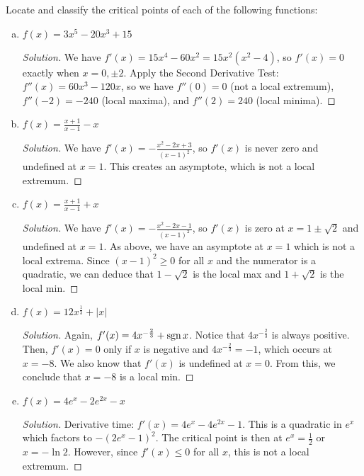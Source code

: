 \documentclass{agony}
\begin{document}
\question Locate and classify the critical points of each of the following functions:
\begin{enumerate}[(a)]
  \item $f(x) = 3x^5-20x^3+15$
        \begin{proof}[Solution]
          We have $f'(x) = 15x^4-60x^2 = 15x^2(x^2-4)$, so $f'(x)=0$ exactly when $x=0,\pm2$.
          Apply the Second Derivative Test: $f''(x) = 60x^3-120x$, so we have
          $f''(0) = 0$ (not a local extremum), $f''(-2) = -240$ (local maxima), and $f''(2)=240$ (local minima).
        \end{proof}
  \item $f(x) = \frac{x+1}{x-1}-x$
        \begin{proof}[Solution]
          We have $f'(x) = -\frac{x^2-2x+3}{(x-1)^2}$, so $f'(x)$ is never zero and undefined at $x=1$.
          This creates an asymptote, which is not a local extremum.
        \end{proof}
  \item $f(x) = \frac{x+1}{x-1}+x$
        \begin{proof}[Solution]
          We have $f'(x) = -\frac{x^2-2x-1}{(x-1)^2}$, so $f'(x)$ is zero at $x=1\pm\sqrt2$ and undefined at $x=1$.
          As above, we have an asymptote at $x=1$ which is not a local extrema.
          Since $(x-1)^2 \geq 0$ for all $x$ and the numerator is a quadratic, we can deduce that
          $1-\sqrt2$ is the local max and $1+\sqrt2$ is the local min.
        \end{proof}
  \item $f(x) = 12x^{\frac{1}{3}}+|x|$
        \begin{proof}[Solution]
          Again, $f'(x) = 4x^{-\frac23} + \operatorname{sgn} x$.
          Notice that $4x^{-\frac23}$ is always positive.
          Then, $f'(x) = 0$ only if $x$ is negative and $4x^{-\frac23} = -1$, which occurs at $x=-8$.
          We also know that $f'(x)$ is undefined at $x=0$.
          From this, we conclude that $x=-8$ is a local min.
        \end{proof}
  \item $f(x) = 4e^x-2e^{2x}-x$
        \begin{proof}[Solution]
          Derivative time: $f'(x) = 4e^x - 4e^{2x} - 1$.
          This is a quadratic in $e^x$ which factors to $-(2e^x - 1)^2$.
          The critical point is then at $e^x = \frac12$ or $x = -\ln 2$.
          However, since $f'(x) \leq 0$ for all $x$, this is not a local extremum.
        \end{proof}

\end{enumerate}
\end{document}
